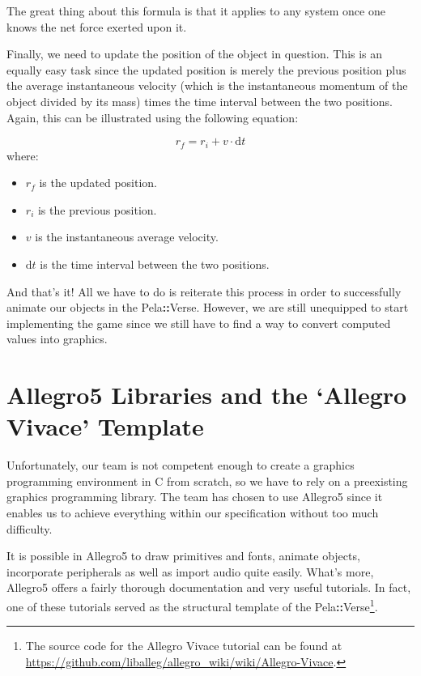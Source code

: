 \documentclass[11pt]{article}
\newcommand{\wrt}[1]{\mathrm{d}#1}
\newcommand{\pelahverse}{Pela\hspace*{1pt}\textbf{::}Verse}
\begin{document}
The great thing about this formula is that it applies to any system once one knows the net force exerted upon it.

Finally, we need to update the position of the object in question. This is an equally easy task since the updated position is merely the previous position plus the average instantaneous velocity (which is the instantaneous momentum of the object divided by its mass) times the time interval between the two positions. Again, this can be illustrated using the following equation:

\begin{equation} r_f = r_i + v \cdot\wrt{t} \end{equation} where:

\begin{itemize}
    \item $r_f$ is the updated position.
    \item $r_i$ is the previous position.
    \item $v$ is the instantaneous average velocity.
    \item $\wrt{t}$ is the time interval between the two positions.
\end{itemize}

And that's it! All we have to do is reiterate this process in order to successfully animate our objects in the \pelahverse{}. However, we are still unequipped to start implementing the game since we still have to find a way to convert computed values into graphics.  

\section{Allegro5 Libraries and the `Allegro Vivace' Template}

Unfortunately, our team is not competent enough to create a graphics programming environment in C from scratch, so we have to rely on a preexisting graphics programming library. The team has chosen to use Allegro5 since it enables us to achieve everything within our specification without too much difficulty.

It is possible in Allegro5 to draw primitives and fonts, animate objects, incorporate peripherals as well as import audio quite easily. What's more, Allegro5 offers a fairly thorough documentation and very useful tutorials. In fact, one of these tutorials served as the structural template of the \pelahverse\footnote {The source code for the Allegro Vivace tutorial can be found at \url{https://github.com/liballeg/allegro_wiki/wiki/Allegro-Vivace}.}.
\end{document}
